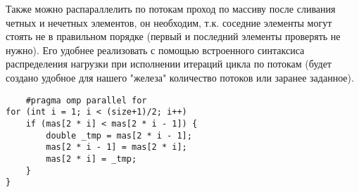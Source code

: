 \documentclass{article}
\begin{document}
Также можно распараллелить по потокам проход по массиву после сливания четных и нечетных элементов, он необходим, т.к. соседние элементы могут стоять не в правильном порядке (первый и последний элементы проверять не нужно). Его удобнее реализовать с помощью встроенного синтаксиса распределения нагрузки при исполнении итераций цикла по потокам (будет создано удобное для нашего "железа" количество потоков или заранее заданное).
\vspace{10pt}
\begin{lstlisting}
    #pragma omp parallel for
for (int i = 1; i < (size+1)/2; i++)
    if (mas[2 * i] < mas[2 * i - 1]) {
        double _tmp = mas[2 * i - 1];
        mas[2 * i - 1] = mas[2 * i];
        mas[2 * i] = _tmp;
    }
}
\end{lstlisting}
\vspace{-25pt}
\end{document}
